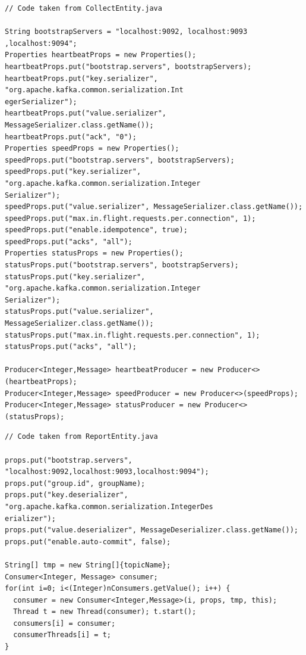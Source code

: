 \documentclass[12pt]{article}
\begin{document}
\begingroup
  \fontsize{9pt}{10pt}\selectfont
  \begin{verbatim}
// Code taken from CollectEntity.java

String bootstrapServers = "localhost:9092, localhost:9093 ,localhost:9094";
Properties heartbeatProps = new Properties();
heartbeatProps.put("bootstrap.servers", bootstrapServers);
heartbeatProps.put("key.serializer", "org.apache.kafka.common.serialization.Int
egerSerializer");
heartbeatProps.put("value.serializer", MessageSerializer.class.getName());
heartbeatProps.put("ack", "0");
Properties speedProps = new Properties();
speedProps.put("bootstrap.servers", bootstrapServers);
speedProps.put("key.serializer", "org.apache.kafka.common.serialization.Integer
Serializer");
speedProps.put("value.serializer", MessageSerializer.class.getName());
speedProps.put("max.in.flight.requests.per.connection", 1);
speedProps.put("enable.idempotence", true);
speedProps.put("acks", "all");
Properties statusProps = new Properties();
statusProps.put("bootstrap.servers", bootstrapServers);
statusProps.put("key.serializer", "org.apache.kafka.common.serialization.Integer
Serializer");
statusProps.put("value.serializer", MessageSerializer.class.getName());
statusProps.put("max.in.flight.requests.per.connection", 1);
statusProps.put("acks", "all");

Producer<Integer,Message> heartbeatProducer = new Producer<>(heartbeatProps);
Producer<Integer,Message> speedProducer = new Producer<>(speedProps);
Producer<Integer,Message> statusProducer = new Producer<>(statusProps);
  \end{verbatim}
\endgroup

\begingroup
  \fontsize{9pt}{10pt}\selectfont
  \begin{verbatim}
// Code taken from ReportEntity.java

props.put("bootstrap.servers", "localhost:9092,localhost:9093,localhost:9094");
props.put("group.id", groupName);
props.put("key.deserializer", "org.apache.kafka.common.serialization.IntegerDes
erializer");
props.put("value.deserializer", MessageDeserializer.class.getName());
props.put("enable.auto-commit", false);

String[] tmp = new String[]{topicName};
Consumer<Integer, Message> consumer;
for(int i=0; i<(Integer)nConsumers.getValue(); i++) {
  consumer = new Consumer<Integer,Message>(i, props, tmp, this);
  Thread t = new Thread(consumer); t.start();
  consumers[i] = consumer;
  consumerThreads[i] = t;
}
  \end{verbatim}
\endgroup
\end{document}
